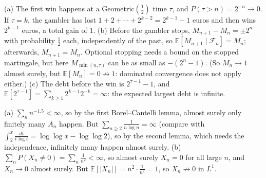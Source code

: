 \documentclass[11pt]{article}
\newcommand{\E}{\mathbb{E}}
\begin{document}
\begin{description}[leftmargin=0pt, itemsep=0.3em]
    \item[\ref{pr:double-or-nothing}.] (a) The first win happens at a Geometric$(\frac{1}{2})$ time $\tau$, and $P(\tau > n) = 2^{-n} \to 0$. If $\tau = k$, the gambler has lost $1 + 2 + \cdots + 2^{k-2} = 2^{k-1} - 1$ euros and then wins $2^{k-1}$ euros, a total gain of $1$. (b) Before the gambler stops, $M_{n+1} - M_n = \pm 2^n$ with probability $\frac{1}{2}$ each, independently of the past, so $\E[M_{n+1} \mid \mathcal{F}_n] = M_n$; afterwards, $M_{n+1} = M_n$. Optional stopping needs a bound on the stopped martingale, but here $M_{\min(n, \tau)}$ can be as small as $-(2^n - 1)$. (So $M_n \to 1$ almost surely, but $\E[M_n] = 0 \not\to 1$: dominated convergence does not apply either.) (c) The debt before the win is $2^{\tau - 1} - 1$, and $\E[2^{\tau - 1}] = \sum_{k \geq 1} 2^{k-1}2^{-k} = \infty$: the expected largest debt is infinite.
    \item[\ref{pr:borel-cantelli}.] (a) $\sum_n n^{-1.5} < \infty$, so by the first Borel--Cantelli lemma, almost surely only finitely many $A_n$ happen. But $\sum_{n \geq 2} \frac{1}{n\log n} = \infty$ (compare with $\int_2^x \frac{dt}{t\log t} = \log\log x - \log\log 2$), so by the second lemma, which needs the independence, infinitely many happen almost surely. (b) $\sum_n P(X_n \neq 0) = \sum_n \frac{1}{n^2} < \infty$, so almost surely $X_n = 0$ for all large $n$, and $X_n \to 0$ almost surely. But $\E[|X_n|] = n^2 \cdot \frac{1}{n^2} = 1$, so $X_n \not\to 0$ in $L^1$.
\end{description}
\end{document}
